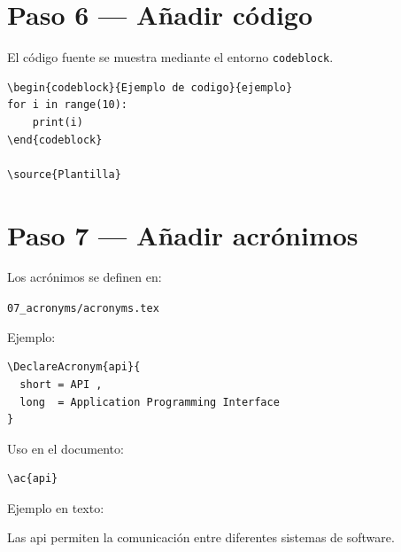 



\section{Paso 6 — Añadir código}

El código fuente se muestra mediante el entorno
\texttt{codeblock}.

\begin{lstlisting}[caption={Bloque de código},label={code:codeblock}]
\begin{codeblock}{Ejemplo de codigo}{ejemplo}
for i in range(10):
    print(i)
\end{codeblock}

\source{Plantilla}
\end{lstlisting}





\section{Paso 7 — Añadir acrónimos}

Los acrónimos se definen en:

\texttt{07\_acronyms/acronyms.tex}

Ejemplo:

\begin{lstlisting}[caption={Definición de acrónimo},label={code:acronym}]
\DeclareAcronym{api}{
  short = API ,
  long  = Application Programming Interface
}
\end{lstlisting}




Uso en el documento:

\begin{lstlisting}[caption={Uso de acrónimo},label={code:acronymuse}]
\ac{api}
\end{lstlisting}




Ejemplo en texto:

\begin{examplebox}
Las \ac{api} permiten la comunicación entre
diferentes sistemas de software.
\end{examplebox}



